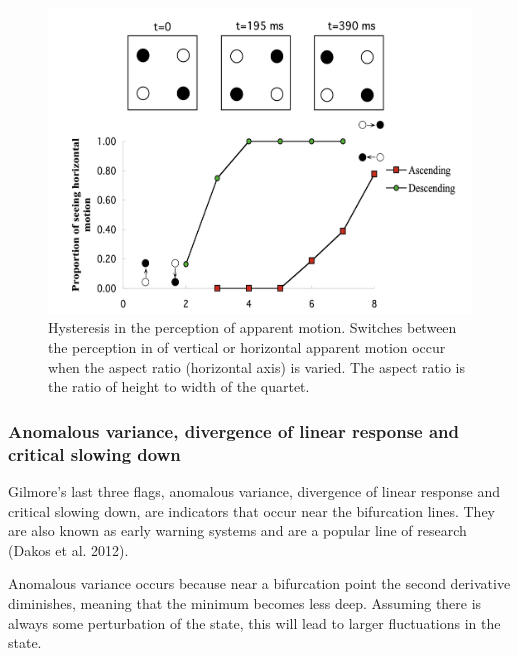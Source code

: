 \documentclass[
  a4paper,
  DIV=11,
  numbers=noendperiod,
  oneside]{scrreprt}
\begin{document}
\begin{figure}

{\centering \includegraphics{media/ch3/image22.jpg}

}

\caption{\label{fig-ch3-img22-old-34}Hysteresis in the perception of
apparent motion. Switches between the perception in of vertical or
horizontal apparent motion occur when the aspect ratio (horizontal axis)
is varied. The aspect ratio is the ratio of height to width of the
quartet.}

\end{figure}

\hypertarget{sec-Anomalous-variance-divergence-of-linear-response-and-critical-slowing-down}{%
\subsubsection{Anomalous variance, divergence of linear response and
critical slowing
down}\label{sec-Anomalous-variance-divergence-of-linear-response-and-critical-slowing-down}}

Gilmore's last three flags, anomalous variance, divergence of linear
response and critical slowing down, are indicators that occur near the
bifurcation lines. They are also known as early warning systems and are
a popular line of research (Dakos et al. 2012).

Anomalous variance occurs because near a bifurcation point the second
derivative diminishes, meaning that the minimum becomes less deep.
Assuming there is always some perturbation of the state, this will lead
to larger fluctuations in the state.
\end{document}

